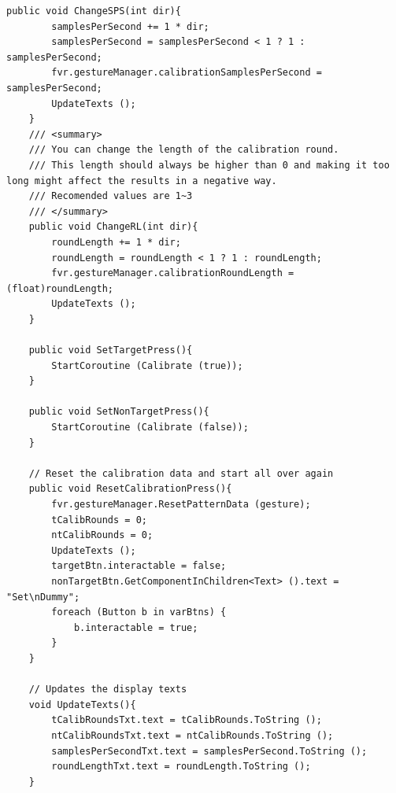 \documentclass{ltjsreport}
\begin{document}
\begin{lstlisting}[caption = CalibrationManager, label = code:Calibration]
    public void ChangeSPS(int dir){
        samplesPerSecond += 1 * dir;
        samplesPerSecond = samplesPerSecond < 1 ? 1 : samplesPerSecond;
        fvr.gestureManager.calibrationSamplesPerSecond = samplesPerSecond;
        UpdateTexts ();
    }
	/// <summary>
	/// You can change the length of the calibration round.
	/// This length should always be higher than 0 and making it too long might affect the results in a negative way.
	/// Recomended values are 1~3
	/// </summary>
    public void ChangeRL(int dir){
        roundLength += 1 * dir;
        roundLength = roundLength < 1 ? 1 : roundLength;
        fvr.gestureManager.calibrationRoundLength = (float)roundLength;
        UpdateTexts ();
    }

    public void SetTargetPress(){
        StartCoroutine (Calibrate (true));
    }

    public void SetNonTargetPress(){
        StartCoroutine (Calibrate (false));
    }

    // Reset the calibration data and start all over again
    public void ResetCalibrationPress(){
        fvr.gestureManager.ResetPatternData (gesture);
        tCalibRounds = 0;
        ntCalibRounds = 0;
        UpdateTexts ();
        targetBtn.interactable = false;
        nonTargetBtn.GetComponentInChildren<Text> ().text = "Set\nDummy";
        foreach (Button b in varBtns) {
            b.interactable = true;
        }
    }

    // Updates the display texts
    void UpdateTexts(){
        tCalibRoundsTxt.text = tCalibRounds.ToString ();
        ntCalibRoundsTxt.text = ntCalibRounds.ToString ();
        samplesPerSecondTxt.text = samplesPerSecond.ToString ();
        roundLengthTxt.text = roundLength.ToString ();
    }


\end{lstlisting}
\end{document}
